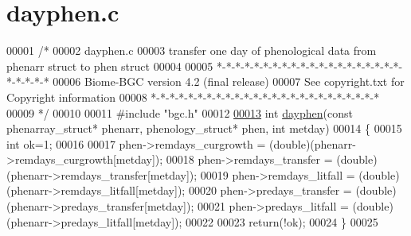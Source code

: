 \hypertarget{dayphen_8c_source}{}\section{dayphen.\+c}
\label{dayphen_8c_source}

\begin{DoxyCode}
00001 \textcolor{comment}{/* }
00002 \textcolor{comment}{dayphen.c}
00003 \textcolor{comment}{transfer one day of phenological data from phenarr struct to phen struct}
00004 \textcolor{comment}{}
00005 \textcolor{comment}{*-*-*-*-*-*-*-*-*-*-*-*-*-*-*-*-*-*-*-*-*-*-*-*-*}
00006 \textcolor{comment}{Biome-BGC version 4.2 (final release)}
00007 \textcolor{comment}{See copyright.txt for Copyright information}
00008 \textcolor{comment}{*-*-*-*-*-*-*-*-*-*-*-*-*-*-*-*-*-*-*-*-*-*-*-*-*}
00009 \textcolor{comment}{*/}
00010 
00011 \textcolor{preprocessor}{#include "bgc.h"}
00012 
\hypertarget{dayphen_8c_source_l00013}{}\hyperlink{dayphen_8c_a4fcbddc6285418ad6002546daa70c853}{00013} \textcolor{keywordtype}{int} \hyperlink{dayphen_8c_a4fcbddc6285418ad6002546daa70c853}{dayphen}(\textcolor{keyword}{const} phenarray\_struct* phenarr, phenology\_struct* phen, \textcolor{keywordtype}{int} metday)
00014 \{
00015     \textcolor{keywordtype}{int} ok=1;
00016     
00017     phen->remdays\_curgrowth = (double)(phenarr->remdays\_curgrowth[metday]);
00018     phen->remdays\_transfer = (double)(phenarr->remdays\_transfer[metday]);
00019     phen->remdays\_litfall = (double)(phenarr->remdays\_litfall[metday]);
00020     phen->predays\_transfer = (double)(phenarr->predays\_transfer[metday]);
00021     phen->predays\_litfall = (double)(phenarr->predays\_litfall[metday]);
00022     
00023     \textcolor{keywordflow}{return}(!ok);
00024 \}
00025     
\end{DoxyCode}
